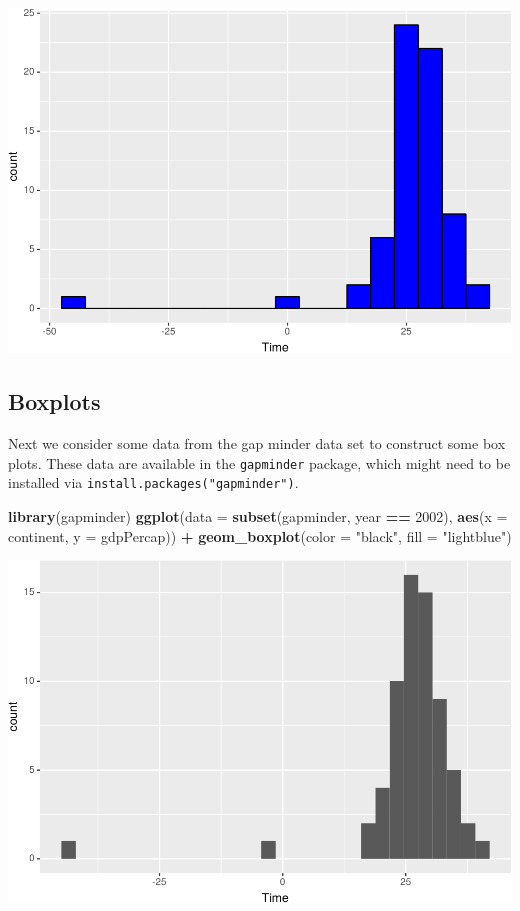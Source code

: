 \documentclass[]{krantz}
\makeatletter
\newenvironment{Shaded}{\begin{snugshade}}{\end{snugshade}}
\newcommand{\DataTypeTok}[1]{\textcolor[rgb]{0.27,0.27,0.27}{#1}}
\newcommand{\DecValTok}[1]{\textcolor[rgb]{0.06,0.06,0.06}{#1}}
\newcommand{\KeywordTok}[1]{\textcolor[rgb]{0.27,0.27,0.27}{\textbf{#1}}}
\newcommand{\NormalTok}[1]{#1}
\newcommand{\OperatorTok}[1]{\textcolor[rgb]{0.43,0.43,0.43}{\textbf{#1}}}
\newcommand{\StringTok}[1]{\textcolor[rgb]{0.5,0.5,0.5}{#1}}
\newenvironment{kframe}{%
\medskip{}
\setlength{\fboxsep}{.8em}
 \def\at@end@of@kframe{}%
 \ifinner\ifhmode%
  \def\at@end@of@kframe{\end{minipage}}%
  \begin{minipage}{\columnwidth}%
 \fi\fi%
 \def\FrameCommand##1{\hskip\@totalleftmargin \hskip-\fboxsep
 \colorbox{shadecolor}{##1}\hskip-\fboxsep
     \hskip-\linewidth \hskip-\@totalleftmargin \hskip\columnwidth}%
 \MakeFramed {\advance\hsize-\width
   \@totalleftmargin\z@ \linewidth\hsize
   \@setminipage}}%
 {\par\unskip\endMakeFramed%
 \at@end@of@kframe}
\renewenvironment{Shaded}{\begin{kframe}}{\end{kframe}}
\makeatother
\begin{document}
\includegraphics{bookdown_files/figure-latex/unnamed-chunk-74-1.pdf}

\hypertarget{boxplots}{%
\subsection{Boxplots}\label{boxplots}}

Next we consider some data from the gap minder data set to construct some box plots. These data are available in the \texttt{gapminder} package, which might need to be installed via \texttt{install.packages("gapminder")}.

\begin{Shaded}
\begin{Highlighting}[]
\KeywordTok{library}\NormalTok{(gapminder)}
\KeywordTok{ggplot}\NormalTok{(}\DataTypeTok{data =} \KeywordTok{subset}\NormalTok{(gapminder,  year }\OperatorTok{==}\StringTok{ }\DecValTok{2002}\NormalTok{), }
       \KeywordTok{aes}\NormalTok{(}\DataTypeTok{x =}\NormalTok{ continent, }\DataTypeTok{y =}\NormalTok{ gdpPercap)) }\OperatorTok{+}\StringTok{ }
\StringTok{    }\KeywordTok{geom_boxplot}\NormalTok{(}\DataTypeTok{color =} \StringTok{"black"}\NormalTok{, }\DataTypeTok{fill =} \StringTok{"lightblue"}\NormalTok{)}
\end{Highlighting}
\end{Shaded}

\includegraphics{bookdown_files/figure-latex/unnamed-chunk-75-1.pdf}
\end{document}
